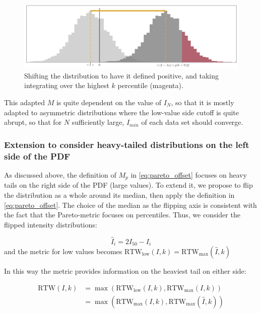 	\begin{figure}[h]
		\centering
		\includegraphics[width=\columnwidth]{Images/Metrics/pareto_shift_explanation.png}
		\caption{Shifting the distribution to have it defined positive, and taking integrating over the highest $k$ percentile (magenta).}
		\label{fig:pareto_shift}
	\end{figure}
	
	This adapted $M$ is quite dependent on the value of $I_N$, so that it is mostly adapted to asymmetric distributions where the low-value side cutoff is quite abrupt, so that for $N$ sufficiently large, $I_{min}$ of each data set should converge. 
	
	
	\subsubsection{Extension to consider heavy-tailed distributions on the left side of the PDF}
	
	As discussed above, the definition of $M_p$ in \cref{eq:pareto_offset} focuses on heavy tails on the right side of the PDF (large values). To extend it, we propose to flip the distribution as a whole around its median, then apply the definition in \cref{eq:pareto_offset}. The choice of the median as the flipping axis is consistent with the fact that the Pareto-metric focuses on percentiles. Thus, we consider the flipped intensity distributions:
	
	\begin{equation}
		 \hat{I}_i=2I_{50}-I_i 
	\end{equation}
	and the metric for low values becomes $\mathrm{RTW}_\textrm{low}(I,k)=\mathrm{RTW}_\textrm{max}(\hat{I},k)$
	
	In this way the metric  provides information on the heaviest tail on either side:
	
	\begin{equation}
		\begin{aligned}
		 \mathrm{RTW}(I,k)&=\max(\mathrm{RTW}_\textrm{low}(I,k),\mathrm{RTW}_\textrm{max}(I,k))\\
		 &=\max(\mathrm{RTW}_\textrm{max}(I,k), \mathrm{RTW}_\textrm{max}(\hat{I},k))
		\end{aligned}
	\end{equation}
	
